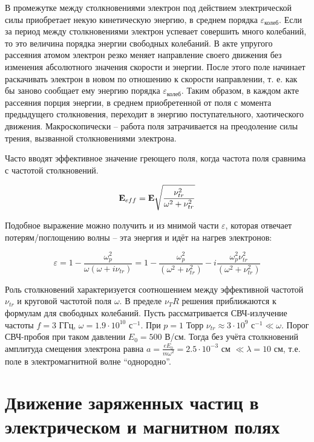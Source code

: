 \documentclass[10pt, a4paper]{article}
\let\stdsection\section
\renewcommand\section{\newpage\stdsection}
\begin{document}
В промежутке между столкновениями электрон под действием электрической силы приобретает некую кинетическую энергию, в среднем порядка $\varepsilon_\text{колеб}$. Если за период между столкновениями электрон успевает совершить много колебаний, то это величина порядка энергии свободных колебаний. В акте упругого рассеяния атомом электрон резко меняет направление своего движения без изменения абсолютного значения скорости и энергии. После этого поле начинает раскачивать электрон в новом по отношению к скорости направлении, т. е. как бы заново сообщает ему энергию порядка $\varepsilon_\text{колеб}$. Таким образом, в каждом акте рассеяния порция энергии, в среднем приобретенной от поля с момента предыдущего столкновения, переходит в энергию поступательного, хаотического движения. Макроскопически -- работа поля затрачивается на преодоление силы трения, вызванной столкновениями электрона.

Часто вводят эффективное значение греющего поля, когда частота поля сравнима с частотой столкновений.

\begin{equation*}
	\vb{E}_{eff} = \vb{E} \sqrt{\frac{\nu_{tr}^2}{\omega^2+\nu_{tr}^2}}
\end{equation*}

Подобное выражение можно получить и из мнимой части $\varepsilon$, которая отвечает потерям/поглощению волны -- эта энергия и идёт на нагрев электронов:

\begin{equation*}
	\varepsilon=1-\frac{\omega_p^2} {\omega (\omega+i\nu_{tr})} = 1-\frac{\omega_p^2}{(\omega^2 + \nu_{tr}^2)}-i \frac{\omega_p^2 \nu^2_{tr}}{(\omega^2 + \nu_{tr}^2)}
\end{equation*}

Роль столкновений характеризуется соотношением между эффективной частотой $\nu_{tr}$ и круговой частотой поля $\omega$. В пределе $\nu_TR$ решения приближаются к формулам для свободных колебаний. Пусть рассматривается СВЧ-излучение частоты $f = 3$ ГГц, $\omega = 1.9\cdot10^{10}$ с$^{-1}$. При $p = 1$ Торр $\nu_{tr} \approx 3\cdot10^9$ с$^{-1} \ll \omega$. Порог СВЧ-пробоя при таком давлении $E_0 = 500$ В/см. Тогда без учёта столкновений амплитуда смещения электрона равна $a = \frac{eE_0}{m\omega^2} = 2.5\cdot10^{-3}$ см $\ll \lambda = 10$ см, т.е. поле в электромагнитной волне ``однородно''.

\section{Движение заряженных частиц в электрическом и магнитном полях} \label{sec:charged_particles_fields}
\end{document}

